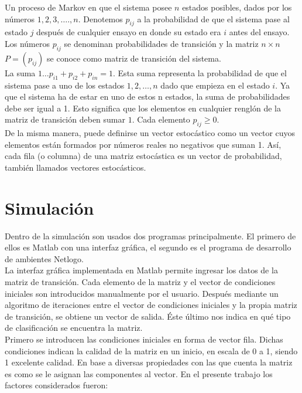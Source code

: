 Un proceso de Markov en que el sistema posee $n$ estados posibles, dados por los números $1, 2, 3,\dots., n$. Denotemos $p_{ij}$  a la probabilidad de que el sistema pase al estado $j$ después de cualquier ensayo en donde su estado era $i$ antes del ensayo. Los números $p_{ij}$  se denominan probabilidades de transición y la matriz $n\times n$  $P = (p_{ij})$ se conoce como matriz de transición del sistema.\\

La suma $1\dots p_{i1} + p_{i2} + p_{in} = 1$. Esta suma representa la probabilidad de que el sistema pase a uno de los estados $1, 2,\dots, n$ dado que empieza en el estado $i$. Ya que el sistema ha de estar en uno de estos n estados, la suma de probabilidades debe ser igual a 1. Esto significa que los elementos en cualquier renglón de la matriz de transición deben sumar $1$.  Cada elemento $p_{ij}\geq0$.\\

De la misma manera, puede definirse un vector estocástico como un vector cuyos elementos están formados por números reales no negativos que suman 1. Así, cada fila (o columna) de una matriz estocástica es un vector de probabilidad, también llamados vectores estocásticos.

\section{Simulación}
Dentro de la simulación son usados dos programas principalmente. El primero de ellos es Matlab con una interfaz gráfica, el segundo es el programa de desarrollo de ambientes Netlogo.\\

La interfaz gráfica implementada en Matlab permite ingresar los datos de la matriz de transición. Cada elemento de la matriz y el vector de condiciones iniciales son introducidos manualmente por el usuario. Después mediante un algoritmo de iteraciones entre el vector de condiciones iniciales y la propia matriz de transición, se obtiene un vector de salida. Éste último nos indica en qué tipo de clasificación se encuentra la matriz.\\

Primero se introducen las condiciones iniciales en forma de vector fila. Dichas condiciones indican la calidad de la matriz en un inicio, en escala de 0 a 1, siendo 1 excelente calidad. En base a diversas propiedades con las que cuenta la matriz es como se le asignan las componentes al vector. En el presente trabajo los factores considerados fueron:

